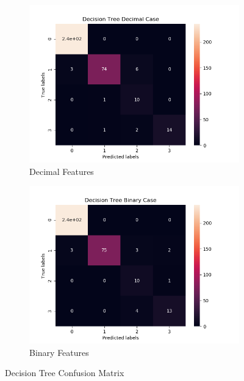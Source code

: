 \begin{figure}[H]
     \centering
     \hspace*{\fill}
     \begin{subfigure}[b]{0.35\textwidth}
         \centering
         \includegraphics[width=\textwidth]{../Figures/Decision Tree Decimal Case_conf_mat.png}
         \caption{Decimal Features}
     \end{subfigure}
     \hfill
     \begin{subfigure}[b]{0.35\textwidth}
         \centering
         \includegraphics[width=\textwidth]{../Figures/Decision Tree Binary Case_conf_mat.png}
         \caption{Binary Features}
     \end{subfigure}
     \hspace*{\fill}
     \caption{Decision Tree Confusion Matrix}
\end{figure}

